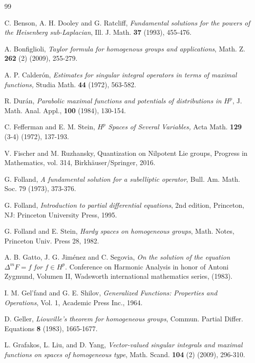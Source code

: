 \documentclass[reqno,10pt]{article}
\theoremstyle{definition}
\numberwithin{equation}{section}
\numberwithin{theorem}{section}
\begin{document}
\begin{thebibliography}{99}

 C. Benson, A. H. Dooley and G. Ratcliff, \textit{Fundamental solutions for the powers of the Heisenberg 
sub-Laplacian}, Ill. J. Math. \textbf{37} (1993), 455-476.

 A. Bonfiglioli, \textit{Taylor formula for homogenous groups and applications}, Math. Z. \textbf{262} (2) (2009), 255-279.

 A. P. Calder\'on, \textit{Estimates for singular integral operators in terms of maximal functions,} Studia Math. 
\textbf{44} (1972), 563-582.

 R. Dur\'an, \textit{Parabolic maximal functions and potentials of distributions in $H^{p}$}, J. Math. Anal. Appl., 
\textbf{100} (1984), 130-154.

 C. Fefferman and E. M. Stein, \textit{$H^{p}$ Spaces of Several Variables,} Acta Math. \textbf{129} (3-4) (1972), 137-193.

 V. Fischer and M. Ruzhansky, Quantization on Nilpotent Lie groups,  Progress in Mathematics, vol. 314, 
Birkh\"auser/Springer, 2016. 

 G. Folland, \textit{A fundamental solution for a subelliptic operator}, Bull. Am. Math. Soc. 79 (1973), 373-376.

 G. Folland, \textit{Introduction to partial differential equations}, 2nd edition, Princeton, NJ: Princeton University Press, 1995.

 G. Folland and E. Stein, \textit{Hardy spaces on homogeneous groups}, Math. Notes, Princeton Univ. Press 28, 1982.

 A. B. Gatto, J. G. Jim\'enez and C. Segovia, \textit{On the solution of the equation $\Delta^{m}F = f$ for 
$f \in H^{p}$}. Conference on Harmonic Analysis in honor of Antoni Zygmund, Volumen II, Wadsworth international mathematics series, (1983).

 I. M. Gel'fand and G. E. Shilov, \textit{Generalized Functions: Properties and Operations}, Vol. 1, Academic Press Inc., 
1964.

 D. Geller, \textit{Liouville's theorem for homogeneous groups}, Commun. Partial Differ. Equations \textbf{8} (1983), 
1665-1677. 

 L. Grafakos, L. Liu, and D. Yang, \textit{Vector-valued singular integrals and maximal functions on spaces of homogeneous type}, Math. Scand. \textbf{104} (2) (2009), 296-310.


\end{thebibliography}
\end{document}
